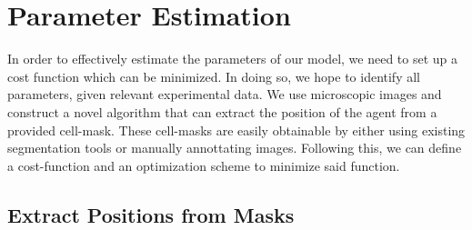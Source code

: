 \documentclass{article}
\begin{document}
\section{Parameter Estimation}

In order to effectively estimate the parameters of our model, we need to set up a cost function
which can be minimized.
In doing so, we hope to identify all parameters, given relevant experimental data.
We use microscopic images and construct a novel algorithm that can extract the position of the agent
from a provided cell-mask.
These cell-masks are easily obtainable by either using existing segmentation tools or manually
annottating images.
Following this, we can define a cost-function and an optimization scheme to minimize said function.

\subsection{Extract Positions from Masks}
\label{section:fitting-and-comparing-masks}
\end{document}

